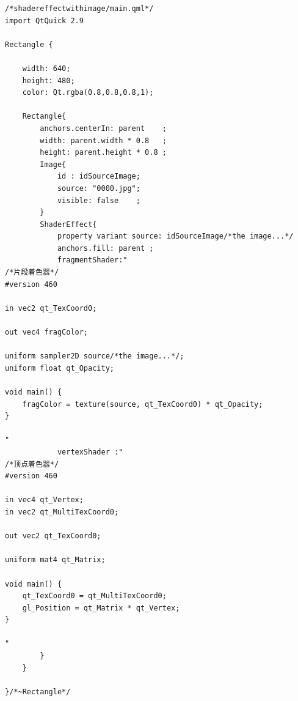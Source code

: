 \FloatBarrier
\begin{lstlisting}[label=f000039,
caption=GoodLuck,
title=\lstlistingname\ \thelstlisting\marginnote{\fbox{\lstlistingname\ \thelstlisting}}
]
/*shadereffectwithimage/main.qml*/
import QtQuick 2.9

Rectangle {

    width: 640;
    height: 480;
    color: Qt.rgba(0.8,0.8,0.8,1);

    Rectangle{
        anchors.centerIn: parent    ;
        width: parent.width * 0.8   ;
        height: parent.height * 0.8 ;
        Image{
            id : idSourceImage;
            source: "0000.jpg";
            visible: false    ;
        }
        ShaderEffect{
            property variant source: idSourceImage/*the image...*/
            anchors.fill: parent ;
            fragmentShader:"
/*片段着色器*/
#version 460

in vec2 qt_TexCoord0;

out vec4 fragColor;

uniform sampler2D source/*the image...*/;
uniform float qt_Opacity;

void main() {
    fragColor = texture(source, qt_TexCoord0) * qt_Opacity;
}

"
            vertexShader :"
/*顶点着色器*/
#version 460

in vec4 qt_Vertex;
in vec2 qt_MultiTexCoord0;

out vec2 qt_TexCoord0;

uniform mat4 qt_Matrix;

void main() {
    qt_TexCoord0 = qt_MultiTexCoord0;
    gl_Position = qt_Matrix * qt_Vertex;
}

"
        }
    }

}/*~Rectangle*/
\end{lstlisting}          %





























